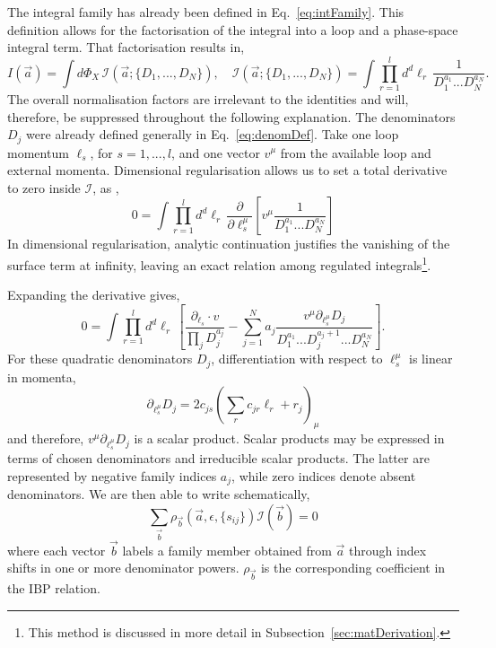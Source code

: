 The integral family has already been defined in Eq.~\eqref{eq:intFamily}. This 
definition allows for the factorisation of the integral into a loop and a phase-space 
integral term. That factorisation results in,
\begin{equation}\label{eq:ibpSepIntegrals}
    I(\vec a) = \int d\Phi_X\,\mathcal I(\vec a;\{D_1,...,D_N\}),\quad \mathcal I(\vec a;\{D_1,...,D_N\}) = \int\prod_{r=1}^l d^d\ell_r\,\frac1{D_1^{a_1}...D_N^{a_N}}.
\end{equation}
The overall normalisation factors are irrelevant to the identities and will, therefore,
be suppressed throughout the following explanation. The denominators $D_j$ were
already defined generally in Eq.~\eqref{eq:denomDef}.
Take one loop momentum $\ell_s$,
for $s=1,...,l$, and one vector $v^\mu$ from the available loop and external 
momenta. Dimensional regularisation allows us to set a total derivative to zero
inside $\mathcal I$, as \cite{GehrmannDeRidder0311276,Chetyrkin:1981qh},
\begin{equation}\label{eq:derivativeToZero}
    0 = \int\prod_{r=1}^l d^d\ell_r\,\frac\partial{\partial\ell_s^\mu}\left[v^\mu\frac1{D_1^{a_1}...D_N^{a_N}}\right]
\end{equation}
In dimensional regularisation,
analytic continuation justifies the vanishing of the surface term at infinity,
leaving an exact relation among regulated integrals\footnote{This method 
is discussed in more detail in Subsection~\ref{sec:matDerivation}.}.

Expanding the derivative gives,
\begin{equation}
    0 = \int\prod_{r=1}^l d^d\ell_r\,\left[\frac{\partial_{\ell_s}\cdot v}{\prod_j D_j^{a_j}}-\sum_{j=1}^N a_j\frac{v^\mu \partial_{\ell_s^\mu} D_j}{D_1^{a_1}...D_j^{a_j+1}...D_N^{a_N}}\right].
\end{equation}
For these quadratic denominators $D_j$, differentiation with respect to 
$\ell_s^\mu$ is linear in momenta,
\begin{equation}
    \partial_{\ell_s^\mu}D_j = 2c_{js}\left(\sum_r c_{jr}\ell_r+r_j\right)_\mu
\end{equation}
and therefore, $v^\mu\partial_{\ell_s^\mu}D_j$ is a scalar product. Scalar products
may be expressed in terms of chosen denominators and irreducible scalar products.
The latter are represented by negative family indices $a_j$, while zero indices
denote absent denominators. We are then able to write schematically,
\begin{equation}
    \sum_{\vec b}\rho_{\vec b}\!\left(\vec a, \epsilon, \{s_{ij}\}\right)\mathcal I(\vec b) = 0
\end{equation}
where each vector $\vec b$ labels a family member obtained from $\vec a$ 
through index shifts in one or more denominator
powers. $\rho_{\vec b}$ is the corresponding coefficient in the IBP relation.

